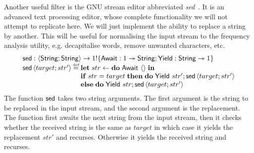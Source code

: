 \documentclass[12pt,phd,lfcs,twoside,openright,logo,leftchapter,normalheadings]{infthesis}
\theoremstyle{plain}
\theoremstyle{definition}
\begin{document}
Another useful filter is the GNU stream editor abbreviated
\emph{sed}~\cite{PizziniBMG20}. It is an advanced text processing
editor, whose complete functionality we will not attempt to replicate
here. We will just implement the ability to replace a string by
another. This will be useful for normalising the input stream to the
frequency analysis utility, e.g. decapitalise words, remove unwanted
characters, etc.
%
\[
  \bl
    \sed : \Record{\String;\String} \to \UnitType \eff \{\Await : \UnitType \opto \String;\Yield : \String \opto \UnitType\}\\
    \sed\,\Record{target;str'} \defas
      \bl
        \Let\;str \revto \Do\;\Await~\Unit\;\In\\
        \If\;str = target\;\Then\;\Do\;\Yield~str';\sed\,\Record{target;str'}\\
        \Else\;\Do\;\Yield~str;\sed\,\Record{target;str'}
      \el
  \el
\]
%
The function $\mathsf{sed}$ takes two string arguments. The first argument is
the string to be replaced in the input stream, and the second argument
is the replacement. The function first awaits the next string from the
input stream, then it checks whether the received string is the same
as $target$ in which case it yields the replacement $str'$ and
recurses. Otherwise it yields the received string and recurses.
\end{document}
